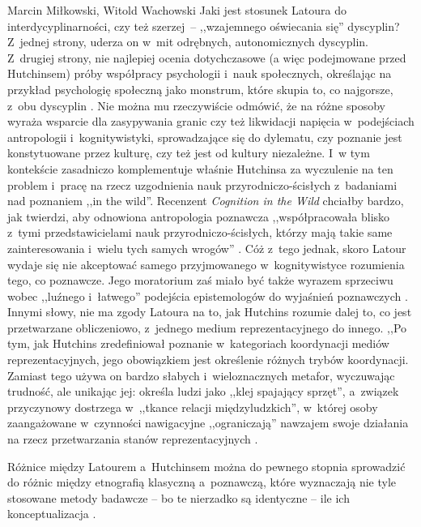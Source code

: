 \begin{artplenv2auth}{Marcin Miłkowski, Witold Wachowski}
Jaki jest stosunek Latoura do interdycyplinarności, czy też szerzej~-- ,,wzajemnego oświecania się'' dyscyplin? Z~jednej strony, uderza on w~mit odrębnych, autonomicznych dyscyplin. Z~drugiej strony, nie najlepiej ocenia dotychczasowe (a więc podejmowane przed Hutchinsem) próby współpracy psychologii i~nauk społecznych, określając na przykład psychologię społeczną jako monstrum, które skupia to, co najgorsze, z~obu dyscyplin
\parencite[][s.~58]{latour_cogito_1996}. %
 Nie można mu rzeczywiście odmówić, że na różne sposoby wyraża wsparcie dla zasypywania granic czy też likwidacji napięcia w~podejściach antropologii i~kognitywistyki, sprowadzające się do dylematu, czy poznanie jest konstytuowane przez kulturę, czy też jest od kultury niezależne. I~w tym kontekście zasadniczo komplementuje właśnie Hutchinsa za wyczulenie na ten problem i~pracę na rzecz uzgodnienia nauk przyrodniczo-ścisłych z~badaniami nad poznaniem ,,in the wild''. Recenzent \textit{Cognition in the Wild} chciałby bardzo, jak twierdzi, aby odnowiona antropologia poznawcza ,,współpracowała blisko z~tymi przedstawicielami nauk przyrodniczo-ścisłych, którzy mają takie same zainteresowania i~wielu tych samych wrogów'' 
\parencite[][s.~61]{latour_cogito_1996}. %
 Cóż z~tego jednak, skoro Latour wydaje się nie akceptować samego przyjmowanego w~kognitywistyce rozumienia tego, co poznawcze. Jego moratorium zaś miało być także wyrazem sprzeciwu wobec ,,luźnego i~łatwego'' podejścia epistemologów do wyjaśnień poznawczych 
\parencite[][s.~62]{latour_cogito_1996}. %
 Innymi słowy, nie ma zgody Latoura na to, jak Hutchins rozumie dalej to, co jest przetwarzane obliczeniowo, z~jednego medium reprezentacyjnego do innego. ,,Po tym, jak Hutchins zredefiniował poznanie w~kategoriach koordynacji mediów reprezentacyjnych, jego obowiązkiem jest określenie różnych trybów koordynacji. Zamiast tego używa on bardzo słabych i~wieloznacznych metafor, wyczuwając trudność, ale unikając jej: określa ludzi jako ,,klej spajający sprzęt'', a~związek przyczynowy dostrzega w~,,tkance relacji międzyludzkich'', w~której osoby zaangażowane w~czynności nawigacyjne ,,ograniczają'' nawzajem swoje działania na rzecz przetwarzania stanów reprezentacyjnych 
\parencites[][s.~61]{latour_cogito_1996}[zob.][s.~202]{hutchins_cognition_1995}.%


Różnice między Latourem a~Hutchinsem można do pewnego stopnia sprowadzić do różnic między etnografią klasyczną a~poznawczą, które wyznaczają nie tyle stosowane metody badawcze -- bo te nierzadko są identyczne -- ile ich konceptualizacja
\parencite[][s.~838–839]{williams_using_2006}.%



\end{artplenv2auth}
